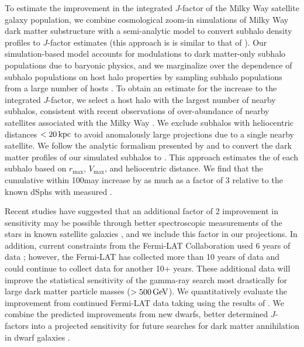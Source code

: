 To estimate the improvement in the integrated $J$-factor of the Milky Way satellite galaxy population, we combine cosmological zoom-in simulations of Milky Way dark matter substructure with a semi-analytic model to convert subhalo density profiles to $J$-factor estimates (this approach is is similar to that of \citealt{1309.4780}). 
Our simulation-based model accounts for modulations to dark matter-only subhalo populations due to baryonic physics, and we marginalize over the dependence of subhalo populations on host halo properties by sampling subhalo populations from a large number of hosts \citep{Nadler:2018}. 
To obtain an estimate for the increase to the integrated $J$-factor, we select a host halo with the largest number of nearby subhalos, consistent with recent observations of over-abundance of nearby satellites associated with the Milky Way \citep{Kim:2018, Graus:2018}. 
We exclude subhalos with heliocentric distances $< 20 \mathrm{\,kpc}$ to avoid anomalously large projections due to a single nearby satellite.
We follow the analytic formalism presented by \citet{1604.05599} and \citet{1802.06811} to convert the dark matter profiles of our simulated subhalos to \Jfactors.  
This approach estimates the \Jfactor of each subhalo based on $r_{\max}$, $V_{\max}$, and heliocentric distance. 
We find that the cumulative \Jfactor within 100\kpc may increase by as much as a factor of 3 relative to the known dSphs with measured \Jfactors. 

Recent studies have suggested that an additional factor of 2 improvement in sensitivity may be possible through better spectroscopic measurements  of the stars in known satellite galaxies \citep{Albert:2017}, and we include this factor in our projections.
In addition, current constraints from the Fermi-LAT Collaboration used 6 years of data \citep{Ackermann:2015}; however, the Fermi-LAT has collected more than 10 years of data and could continue to collect data for another 10+ years.
These additional data will improve the statistical sensitivity of the gamma-ray search most drastically for large dark matter particle masses ($>500\mathrm{\,GeV}$).
We quantitatively evaluate the improvement from continued Fermi-LAT data taking using the results of \citep{Charles:2016}.
We combine the predicted improvements from new dwarfs, better determined $J$-factors into a projected sensitivity for future searches for dark matter annihilation in dwarf galaxies .

